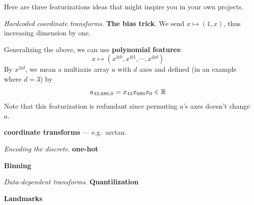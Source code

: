         Here are three featurizations ideas that might inspire you in
        your own projects.

        \emph{Hardcoded coordinate transforms}.
        \textbf{The bias trick}.\bcirc{}
        We send
        $x \mapsto (1, x)$, thus increasing dimension by one.
        \par
        Generalizing the above, we can
        use \textbf{polynomial features}:
        $$
            x \mapsto (x^{\otimes 0}, x^{\otimes 1}, \cdots, x^{\otimes d})
        $$
        By $x^{\otimes d}$, we mean a multiaxis array $a$ with $d$ axes and
        defined (in an example where $d=3$) by
        $$
            a_{42,686,0} = x_{42} x_{686} x_0 \in \mathbb{R}
        $$
        Note that this featurization is redundant since permuting $a$'s axes
        doesn't change $a$.
        \par
        \textbf{coordinate transforms} --- e.g.\ arctan.

        \emph{Encoding the discrete}.
        \textbf{one-hot}
        \par
        \textbf{Binning}

        \emph{Data-dependent transforms}.
        \textbf{Quantilization}
        \par
        \textbf{Landmarks}



